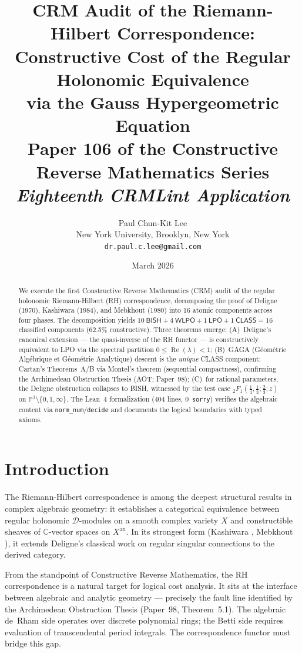 \documentclass[11pt,a4paper]{article}
\title{\textbf{CRM Audit of the Riemann-Hilbert Correspondence:\\
Constructive Cost of the Regular Holonomic Equivalence\\
via the Gauss Hypergeometric Equation}\\[6pt]
\large Paper 106 of the Constructive Reverse Mathematics Series\\[6pt]
\normalsize\textit{Eighteenth CRMLint Application}}
\author{Paul Chun-Kit Lee\\
\small New York University, Brooklyn, New York\\
\small\texttt{dr.paul.c.lee@gmail.com}}
\date{March 2026}
\theoremstyle{plain}
\theoremstyle{definition}
\newcommand{\BISH}{\textsf{BISH}}
\newcommand{\WLPO}{\textsf{WLPO}}
\newcommand{\LPO}{\textsf{LPO}}
\newcommand{\CLASS}{\textsf{CLASS}}
\newcommand{\CRM}{\textsf{CRM}}
\newcommand{\C}{\mathbb{C}}
\newcommand{\PP}{\mathbb{P}}
\renewcommand{\Re}{\operatorname{Re}}
\begin{document}
\maketitle

\begin{abstract}
We execute the first Constructive Reverse Mathematics (\CRM) audit of the regular holonomic Riemann-Hilbert (RH) correspondence, decomposing the proof of Deligne (1970), Kashiwara (1984), and Mebkhout (1980) into 16 atomic components across four phases.
The decomposition yields $10\ \BISH + 4\ \WLPO + 1\ \LPO + 1\ \CLASS = 16$ classified components (62.5\% constructive).
Three theorems emerge:
(A)~Deligne's canonical extension --- the quasi-inverse of the RH functor --- is constructively equivalent to \LPO{} via the spectral partition $0 \le \Re(\lambda) < 1$;
(B)~GAGA (G\'eom\'etrie Alg\'ebrique et G\'eom\'etrie Analytique) descent is the \emph{unique} \CLASS{} component: Cartan's Theorems~A/B via Montel's theorem (sequential compactness), confirming the Archimedean Obstruction Thesis (AOT; Paper~98);
(C)~for rational parameters, the Deligne obstruction collapses to \BISH, witnessed by the test case ${}_2F_1(\tfrac{1}{4}, \tfrac{1}{3}; \tfrac{2}{3}; z)$ on $\PP^1 \setminus \{0,1,\infty\}$.
The Lean~4 formalization (404 lines, 0~\texttt{sorry}) verifies the algebraic content via \texttt{norm\_num}/\texttt{decide} and documents the logical boundaries with typed axioms.
\end{abstract}

\section{Introduction}

The Riemann-Hilbert correspondence is among the deepest structural results in complex algebraic geometry: it establishes a categorical equivalence between regular holonomic $\mathcal{D}$-modules on a smooth complex variety $X$ and constructible sheaves of $\C$-vector spaces on $X^{\mathrm{an}}$.
In its strongest form (Kashiwara \cite{Kashiwara1984}, Mebkhout \cite{Mebkhout1980}), it extends Deligne's classical work on regular singular connections \cite{Deligne1970} to the derived category.

From the standpoint of Constructive Reverse Mathematics, the RH correspondence is a natural target for logical cost analysis.
It sits at the interface between algebraic and analytic geometry --- precisely the fault line identified by the Archimedean Obstruction Thesis (Paper~98, Theorem~5.1).
The algebraic de~Rham side operates over discrete polynomial rings; the Betti side requires evaluation of transcendental period integrals.
The correspondence functor must bridge this gap.
\end{document}
